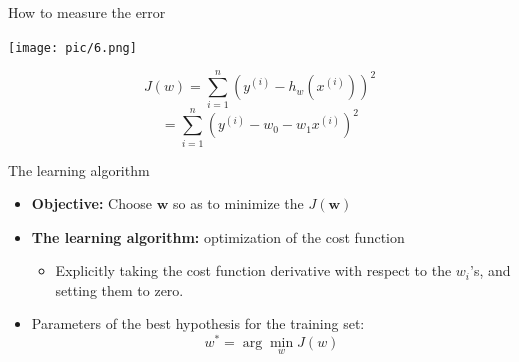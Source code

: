 \documentclass[serif, aspectratio=169]{beamer}
\begin{document}
    \begin{frame}{How to measure the error}

        \begin{minipage}{0.5\textwidth}
            \centering
            \texttt{[image: pic/6.png]}
        \end{minipage}%
        \begin{minipage}{0.5\textwidth}

            \[
                J(w) = \sum_{i=1}^{n} \left( y^{(i)} - h_w(x^{(i)}) \right)^2
            \]
            \[
                = \sum_{i=1}^{n} \left( y^{(i)} - w_0 - w_1 x^{(i)} \right)^2
            \]
        \end{minipage}
        \vfill
    \end{frame}


    \begin{frame}{The learning algorithm}

        \begin{itemize}
            \item \textbf{Objective:} Choose \( \mathbf{w} \) so as to minimize the \( J(\mathbf{w}) \)

            \item \textbf{The learning algorithm:} optimization of the cost function
            \begin{itemize}
                \item Explicitly taking the cost function derivative with respect to the \( w_i \)'s, and setting them to zero.
            \end{itemize}

            \item Parameters of the best hypothesis for the training set:
            \[
                w^* = \arg \min_{w} J(w)
            \]
        \end{itemize}


    \end{frame}
\end{document}
